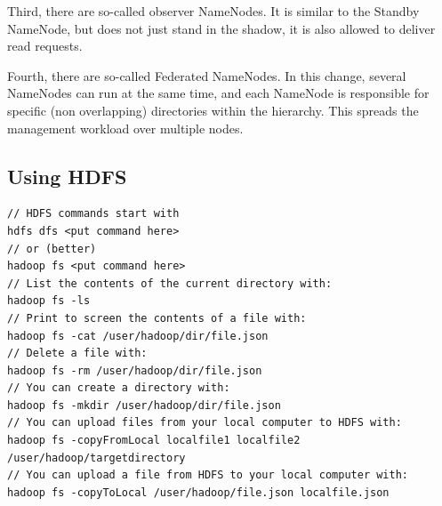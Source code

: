 Third, there are so-called observer NameNodes. It is similar to the Standby NameNode, but does not just stand in the shadow, it is also allowed to deliver read requests.

Fourth, there are so-called Federated NameNodes. In this change, several NameNodes can run at the same time, and each NameNode is responsible for specific (non overlapping) directories within the hierarchy. This spreads the management workload over multiple nodes.


\subsection{Using HDFS}

\begin{lstlisting}[style=hdfs, caption={Example HDFS code}, label={lst:hdfs}]
// HDFS commands start with
hdfs dfs <put command here>
// or (better)
hadoop fs <put command here>
// List the contents of the current directory with:
hadoop fs -ls
// Print to screen the contents of a file with:
hadoop fs -cat /user/hadoop/dir/file.json
// Delete a file with:
hadoop fs -rm /user/hadoop/dir/file.json
// You can create a directory with:
hadoop fs -mkdir /user/hadoop/dir/file.json
// You can upload files from your local computer to HDFS with:
hadoop fs -copyFromLocal localfile1 localfile2 /user/hadoop/targetdirectory
// You can upload a file from HDFS to your local computer with:
hadoop fs -copyToLocal /user/hadoop/file.json localfile.json
\end{lstlisting}

